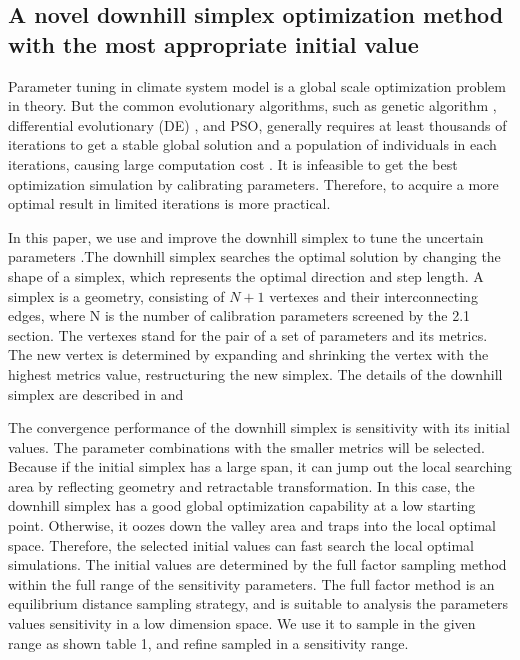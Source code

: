 \documentclass[gmd, manuscript]{copernicus}
\begin{document}
\subsection{A novel downhill simplex optimization method with the most appropriate initial value}

Parameter tuning in climate system model is a global scale optimization problem in theory.  But the common evolutionary algorithms, such as genetic algorithm \citep{goldberg1989messy}, differential evolutionary (DE) \citep{storn1995differential} , and PSO, generally requires at least  thousands of iterations to get a stable global solution and a population of individuals in each iterations, causing large computation cost \citep{hegerty2009comparative,shi1999empirical}. It is infeasible to get the best optimization simulation by calibrating parameters. Therefore, to acquire a more optimal result in limited iterations is more practical.

In this paper, we use and improve the downhill simplex to tune the uncertain parameters .The downhill simplex searches the optimal solution by changing the shape of a simplex, which represents the optimal direction and step length. A simplex is a geometry, consisting of $N+1$ vertexes and their interconnecting edges, where N is the number of calibration parameters screened by the 2.1 section. The vertexes stand for the pair of a set of parameters and its metrics. The new vertex is determined by expanding and shrinking the vertex with the highest metrics value, restructuring the new simplex. The details of the downhill simplex are described in \cite{press1992numerical} and \cite{nelder1965simplex}


The convergence performance of the downhill simplex is sensitivity with its initial values. The parameter combinations with the smaller metrics will be selected.  Because if the initial simplex has a large span, it can jump out the local searching area by reflecting geometry and retractable transformation. In this case, the downhill simplex has a good global optimization capability at a low starting point. Otherwise, it oozes down the valley area and traps into the local optimal space. Therefore, the selected initial values can fast search the local optimal simulations.  The initial values are determined by the full factor sampling method within the full range of the sensitivity parameters.  The full factor method is an equilibrium distance sampling strategy, and is suitable to analysis the parameters values sensitivity in a low dimension space. We use it to sample in the given range as shown table 1, and refine sampled in a sensitivity range.
\end{document}
